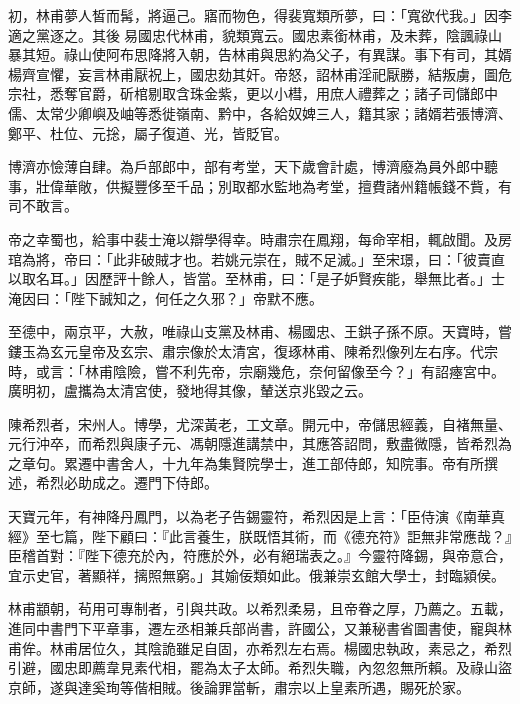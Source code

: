 \begin{pinyinscope}
 初，林甫夢人皙而髯，將逼己。寤而物色，得裴寬類所夢，曰：「寬欲代我。」因李適之黨逐之。其後易國忠代林甫，貌類寬云。國忠素銜林甫，及未葬，陰諷祿山暴其短。祿山使阿布思降將入朝，告林甫與思約為父子，有異謀。事下有司，其婿楊齊宣懼，妄言林甫厭祝上，國忠劾其奸。帝怒，詔林甫淫祀厭勝，結叛虜，圖危宗社，悉奪官爵，斫棺剔取含珠金紫，更以小槥，用庶人禮葬之；諸子司儲郎中儒、太常少卿嶼及岫等悉徙嶺南、黔中，各給奴婢三人，籍其家；諸婿若張博濟、鄭平、杜位、元捴，屬子復道、光，皆貶官。



 博濟亦憸薄自肆。為戶部郎中，部有考堂，天下歲會計處，博濟廢為員外郎中聽事，壯偉華敞，供擬豐侈至千品；別取都水監地為考堂，擅費諸州籍帳錢不貲，有司不敢言。



 帝之幸蜀也，給事中裴士淹以辯學得幸。時肅宗在鳳翔，每命宰相，輒啟聞。及房琯為將，帝曰：「此非破賊才也。若姚元崇在，賊不足滅。」至宋璟，曰：「彼賣直以取名耳。」因歷評十餘人，皆當。至林甫，曰：「是子妒賢疾能，舉無比者。」士淹因曰：「陛下誠知之，何任之久邪？」帝默不應。



 至德中，兩京平，大赦，唯祿山支黨及林甫、楊國忠、王鉷子孫不原。天寶時，嘗鏤玉為玄元皇帝及玄宗、肅宗像於太清宮，復琢林甫、陳希烈像列左右序。代宗時，或言：「林甫陰險，嘗不利先帝，宗廟幾危，奈何留像至今？」有詔瘞宮中。廣明初，盧攜為太清宮使，發地得其像，輦送京兆毀之云。



 陳希烈者，宋州人。博學，尤深黃老，工文章。開元中，帝儲思經義，自褚無量、元行沖卒，而希烈與康子元、馮朝隱進講禁中，其應答詔問，敷盡微隱，皆希烈為之章句。累遷中書舍人，十九年為集賢院學士，進工部侍郎，知院事。帝有所撰述，希烈必助成之。遷門下侍郎。



 天寶元年，有神降丹鳳門，以為老子告錫靈符，希烈因是上言：「臣侍演《南華真經》至七篇，陛下顧曰：『此言養生，朕既悟其術，而《德充符》詎無非常應哉？』臣稽首對：『陛下德充於內，符應於外，必有絕瑞表之。』今靈符降錫，與帝意合，宜示史官，著顯祥，摛照無窮。」其媮佞類如此。俄兼崇玄館大學士，封臨潁侯。



 林甫顓朝，茍用可專制者，引與共政。以希烈柔易，且帝眷之厚，乃薦之。五載，進同中書門下平章事，遷左丞相兼兵部尚書，許國公，又兼秘書省圖書使，寵與林甫侔。林甫居位久，其陰詭雖足自固，亦希烈左右焉。楊國忠執政，素忌之，希烈引避，國忠即薦韋見素代相，罷為太子太師。希烈失職，內忽忽無所賴。及祿山盜京師，遂與達奚珣等偕相賊。後論罪當斬，肅宗以上皇素所遇，賜死於家。



\end{pinyinscope}